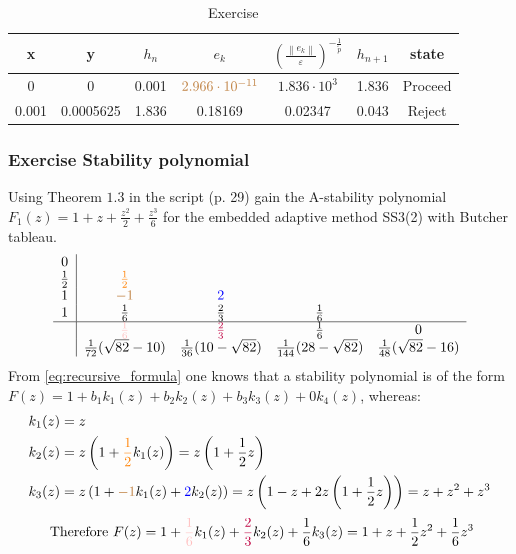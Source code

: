 \begin{table}[ht]
    \centering
    \begin{tabular}{|c|c|c|c|c|c|c|}
    \hline x & y &  $h_n$ & $e_k$ & $\left(\frac{\left\|e_k\right\|}{\varepsilon}\right)^{-\frac{1}{\widetilde{p}}}$ & $h_{n+1}$&state\\
    \hline
    0& 0& 0.001 &$\textcolor{brown}{2.966\cdot 10^{-11}}$&$1.836\cdot 10^3$&1.836&Proceed\\
    \hline
    0.001& 0.0005625&1.836&0.18169&0.02347&0.043&Reject\\
    \hline
    \end{tabular}
    \caption{Exercise}
    \label{tab:example_tab}
\end{table}

\subsubsection{Exercise Stability polynomial}
Using Theorem $1.3$ in the script (p. 29) gain the A-stability polynomial $F_1(z)=1+z+\frac{z^2}{2}+\frac{z^3}{6}$ for the embedded adaptive method SS3(2) with Butcher tableau.
$$
\begin{array}{c|cccc}
0\\
\frac{1}{2} & \textcolor{orange}{\frac{1}{2}} & & \\
1 & \textcolor{brown}{-1} & \textcolor{blue}{2} &  \\
1 &  \frac{1}{6} & \frac{2}{3} & \frac{1}{6} \\
\hline
&\textcolor{pink}{\frac{1}{6}} & \textcolor{purple}{\frac{2}{3}} & \frac{1}{6}&0 \\
&\frac{1}{72}(\sqrt{82}-10) & \frac{1}{36}(10-\sqrt{82}) & \frac{1}{144}(28-\sqrt{82}) & \frac{1}{48}(\sqrt{82}-16)
\end{array}
$$
From \autoref{eq:recursive_formula} one knows that a stability polynomial is of the form $F(z)=1+b_1 k_1(z)+b_2 k_2(z)+b_3 k_3(z)+0 k_4(z)$, whereas:
$$
\begin{aligned}
& k_1(z)=z \\
& k_2(z)=z\left(1+\textcolor{orange}{\frac{1}{2}} k_1(z)\right)=z\left(1+\frac{1}{2} z\right) \\
& k_3(z)=z\left(1+\textcolor{brown}{-1} k_1(z)+\textcolor{blue}{2} k_2(z)\right)=z\left(1-z+2 z\left(1+\frac{1}{2} z\right)\right)=z+z^2+z^3
\end{aligned}
$$
$$
\text { Therefore } F(z)=1+\textcolor{pink}{\frac{1}{6}} k_1(z)+\textcolor{purple}{\frac{2}{3}} k_2(z)+\frac{1}{6} k_3(z)=1+z+\frac{1}{2} z^2+\frac{1}{6} z^3
$$

